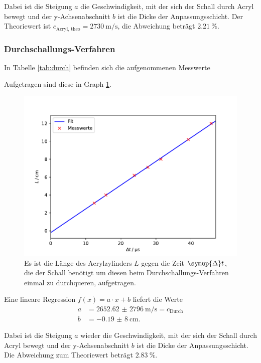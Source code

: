 Dabei ist die Steigung $a$ die Geschwindigkeit, mit der sich der Schall durch Acryl bewegt und der y-Achsenabschnitt $b$ ist
die Dicke der Anpassungsschicht.
Der Theoriewert \cite{sample2} ist $c_\text{Acryl, theo} = \SI{2730}{\m \per \s}$, die Abweichung beträgt $\SI{2,21}{\%}$.

\subsubsection{Durchschallungs-Verfahren}

In Tabelle \ref{tab:durch} befinden sich die aufgenommenen Messwerte


Aufgetragen sind diese in Graph \ref{fig:durch}.
\begin{figure}[H]
  \centering
  \includegraphics[width=\textwidth]{Plots/durch.pdf}
  \caption{Es ist die Länge des Acrylzylinders $L$ gegen die Zeit $\symup{\Delta}t$, die der Schall benötigt um diesen beim Durchschallungs-Verfahren einmal zu durchqueren, aufgetragen.}
  \label{fig:durch}
\end{figure}

Eine lineare Regression $f(x) = a \cdot x + b$ liefert die Werte
\begin{align*}
  a &= \SI{2652,62(2796)}{\m \per \s} = c_\text{Durch} \\
  b &= \SI{-0,19(8)}{\cm}.
\end{align*}

Dabei ist die Steigung $a$ wieder die Geschwindigkeit, mit der sich der Schall durch Acryl bewegt und der y-Achsenabschnitt $b$ ist
die Dicke der Anpassungsschicht. Die Abweichung zum Theoriewert \cite{sample2} beträgt $\SI{2,83}{\%}$.

